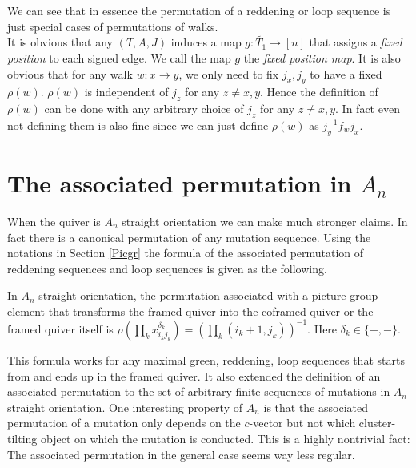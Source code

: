 \indent We can see that in essence the permutation of a reddening or loop sequence is just special cases of permutations of walks.\\
\indent It is obvious that any $(T,A,J)$ induces a map $g:\tilde{T_1}\to [n]$ that assigns a \textit{fixed position} to each signed edge. We call the map $g$ the \textit{fixed position map}. It is also obvious that for any walk $w: x\rightarrow y$, we only need to fix $j_x, j_y$ to have a fixed $\rho(w)$. $\rho(w)$ is independent of $j_z$ for any $z\neq x, y$. Hence the definition of $\rho(w)$ can be done with any arbitrary choice of $j_z$ for any $z\neq x,y$. In fact even not defining them is also fine since we can just define $\rho(w)$ as $j_y^{-1}f_wj_x$.\\
\section{The associated permutation in $A_n$}
\indent When the quiver is $A_n$ straight orientation we can make much stronger claims. In fact there is a canonical permutation of any mutation sequence. Using the notations in Section \ref{Picgr} the formula of the associated permutation of reddening sequences and loop sequences is given as the following.\\
\begin{theorem}
In $A_n$ straight orientation, the permutation associated with a picture group element that transforms the framed quiver into the coframed quiver or the framed quiver itself is $\rho(\prod_{k}x_{i_kj_k}^{\delta_k}) = (\prod_{k}(i_k+1,j_k))^{-1}$. Here $\delta_k\in\{+,-\}$.\\
\end{theorem}
\indent This formula works for any maximal green, reddening, loop sequences that starts from and ends up in the framed quiver. It also extended the definition of an associated permutation to the set of arbitrary finite sequences of mutations in $A_n$ straight orientation. One interesting property of $A_n$ is that the associated permutation of a mutation only depends on the $c$-vector but not which cluster-tilting object on which the mutation is conducted. This is a highly nontrivial fact: The associated permutation in the general case seems way less regular.\\
